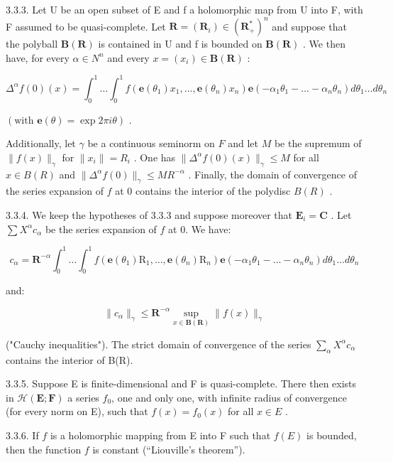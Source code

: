 3.3.3. Let U be an open subset of E and f a holomorphic map from U into F, with F assumed to be quasi-complete. Let \(\mathbf{R} = (\mathbf{R}_{i}) \in (\mathbf{R}_{+}^{*})^{n}\) and suppose that the polyball \(\mathbf{B}(\mathbf{R})\) is contained in U and f is bounded on \(\mathbf{B}(\mathbf{R})\) . We then have, for every \(\alpha \in N^{n}\) and every \(x = (x_{i}) \in \mathbf{B}(\mathbf{R})\) :

\[
\Delta^ {\alpha} f (0) (x) = \int_ {0} ^ {1} \dots \int_ {0} ^ {1} f (\mathbf {e} (\theta_ {1}) x _ {1}, \dots , \mathbf {e} (\theta_ {n}) x _ {n}) \mathbf {e} (- \alpha_ {1} \theta_ {1} - \dots - \alpha_ {n} \theta_ {n}) d \theta_ {1} \dots d \theta_ {n}
\]

\((\text{with } \mathbf{e}(\theta) = \exp 2\pi i \theta)\) .

Additionally, let \(\gamma\) be a continuous seminorm on \(F\) and let \(M\) be the supremum of \(\|f(x)\|_{\gamma}\) for \(\|x_{i}\|=R_{i}\) . One has \(\|\Delta^{\alpha}f(0)(x)\|_{\gamma}\leqslant M\) for all \(x\in B(R)\) and \(\|\Delta^{\alpha}f(0)\|_{\gamma}\leqslant MR^{-\alpha}\) . Finally, the domain of convergence of the series expansion of \(f\) at 0 contains the interior of the polydisc \(B(R)\) .

3.3.4. We keep the hypotheses of 3.3.3 and suppose moreover that \(\mathbf{E}_i = \mathbf{C}\) . Let \(\sum X^{\alpha}c_{\alpha}\) be the series expansion of \(f\) at 0. We have:

\[
c _ {\alpha} = \mathbf {R} ^ {- \alpha} \int_ {0} ^ {1} \dots \int_ {0} ^ {1} f (\mathbf {e} (\theta_ {1}) \mathrm{R} _ {1}, \dots , \mathbf {e} (\theta_ {n}) \mathrm{R} _ {n}) \mathbf {e} (- \alpha_ {1} \theta_ {1} - \dots - \alpha_ {n} \theta_ {n}) d \theta_ {1} \dots d \theta_ {n}
\]

and:

\[
\| c _ {\alpha} \| _ {\gamma} \leqslant \mathbf {R} ^ {- \alpha} \sup _ {x \in \mathbf {B} (\mathbf {R})} \| f (x) \| _ {\gamma}
\]

("Cauchy inequalities"). The strict domain of convergence of the series \(\sum_{\alpha} X^{\alpha} c_{\alpha}\) contains the interior of B(R).

3.3.5. Suppose E is finite-dimensional and F is quasi-complete. There then exists in \(\mathcal{H}(\mathbf{E};\mathbf{F})\) a series \(f_{0}\), one and only one, with infinite radius of convergence (for every norm on E), such that \(f(x)=f_{0}(x)\) for all \(x\in E\) .

3.3.6. If \(f\) is a holomorphic mapping from E into F such that \(f(E)\) is bounded, then the function \(f\) is constant (“Liouville’s theorem”).

